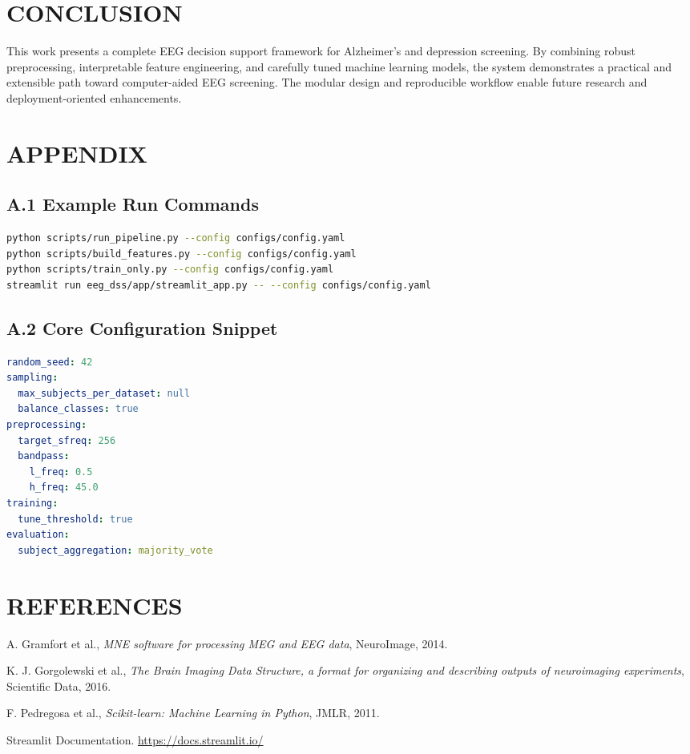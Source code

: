 \documentclass[12pt,a4paper]{report}
\begin{document}
\chapter{CONCLUSION}
\justifying
This work presents a complete EEG decision support framework for Alzheimer's and depression screening. By combining robust preprocessing, interpretable feature engineering, and carefully tuned machine learning models, the system demonstrates a practical and extensible path toward computer-aided EEG screening. The modular design and reproducible workflow enable future research and deployment-oriented enhancements.

\chapter{APPENDIX}
\section*{A.1 Example Run Commands}
\begin{lstlisting}[language=bash]
python scripts/run_pipeline.py --config configs/config.yaml
python scripts/build_features.py --config configs/config.yaml
python scripts/train_only.py --config configs/config.yaml
streamlit run eeg_dss/app/streamlit_app.py -- --config configs/config.yaml
\end{lstlisting}

\section*{A.2 Core Configuration Snippet}
\begin{lstlisting}[language=yaml]
random_seed: 42
sampling:
  max_subjects_per_dataset: null
  balance_classes: true
preprocessing:
  target_sfreq: 256
  bandpass:
    l_freq: 0.5
    h_freq: 45.0
training:
  tune_threshold: true
evaluation:
  subject_aggregation: majority_vote
\end{lstlisting}

\clearpage
\chapter*{REFERENCES}
\begin{thebibliography}{9}
A. Gramfort et al., \textit{MNE software for processing MEG and EEG data}, NeuroImage, 2014.

K. J. Gorgolewski et al., \textit{The Brain Imaging Data Structure, a format for organizing and describing outputs of neuroimaging experiments}, Scientific Data, 2016.

F. Pedregosa et al., \textit{Scikit-learn: Machine Learning in Python}, JMLR, 2011.

Streamlit Documentation. \url{https://docs.streamlit.io/}
\end{thebibliography}
\end{document}
